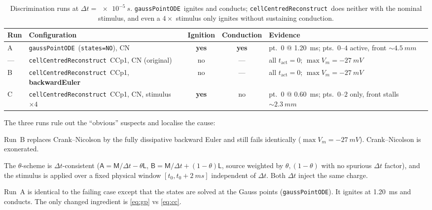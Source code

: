 \documentclass[11pt,a4paper]{article}
\newcommand{\Vm}{V_{m}}
\newcommand{\code}[1]{\texttt{\small #1}}
\newcommand{\gpode}{\code{gaussPointODE}}
\newcommand{\ccrec}{\code{cellCentredReconstruct}}
\begin{document}
\begin{table}[h]
\centering
\footnotesize
\begin{tabular}{@{}l l c c p{5.2cm}@{}}
\toprule
Run & Configuration & Ignition & Conduction & Evidence \\
\midrule
A & \gpode\ (\code{states=NO}), CN            & \textbf{yes} & \textbf{yes}
  & pt.\ $0$ @ \SI{1.20}{ms}; pts.\ $0$--$4$ active, front ${\sim}\SI{4.5}{mm}$ \\
--- & \ccrec\ CCp1, CN (original)             & no  & ---
  & all $t_{\mathrm{act}}=0$; $\max \Vm=\SI{-27}{mV}$ \\
B & \ccrec\ CCp1, \textbf{backwardEuler}      & no  & ---
  & all $t_{\mathrm{act}}=0$; $\max \Vm=\SI{-27}{mV}$ \\
C & \ccrec\ CCp1, CN, stimulus $\times 4$     & \textbf{yes} & no
  & pt.\ $0$ @ \SI{0.60}{ms}; pts.\ $0$--$2$ only, front stalls ${\sim}\SI{2.3}{mm}$ \\
\bottomrule
\end{tabular}
\caption{Discrimination runs at $\Delta t=\SI{e-5}{s}$. \gpode\ ignites and
conducts; \ccrec\ does neither with the nominal stimulus, and even a
$4\times$ stimulus only ignites without sustaining conduction.}
\label{tab:disc}
\end{table}

\noindent The three runs rule out the ``obvious'' suspects and localise the cause:
\begin{description}[style=nextline,leftmargin=1.2em,nosep]
  \item[Not the time scheme.] Run~B replaces Crank--Nicolson by the fully
    dissipative backward Euler and still fails identically
    ($\max\Vm=\SI{-27}{mV}$). Crank--Nicolson is exonerated.
  \item[Not a $\Delta t$-scaling bug.] The $\theta$-scheme is $\Delta t$-consistent
    ($\mathsf{A}=\mathsf{M}/\Delta t-\theta\mathsf{L}$,
    $\mathsf{B}=\mathsf{M}/\Delta t+(1-\theta)\mathsf{L}$, source weighted by
    $\theta,(1-\theta)$ with no spurious $\Delta t$ factor), and the stimulus is
    applied over a fixed physical window $[t_0,t_0+\SI{2}{ms}]$ independent of
    $\Delta t$. Both $\Delta t$ inject the same charge.
  \item[It \emph{is} the state mode.] Run~A is identical to the failing case
    except that the states are solved at the Gauss points (\gpode). It ignites at
    \SI{1.20}{ms} and conducts. The only changed ingredient is
    \eqref{eq:gp} vs \eqref{eq:cc}.
\end{description}
\end{document}
